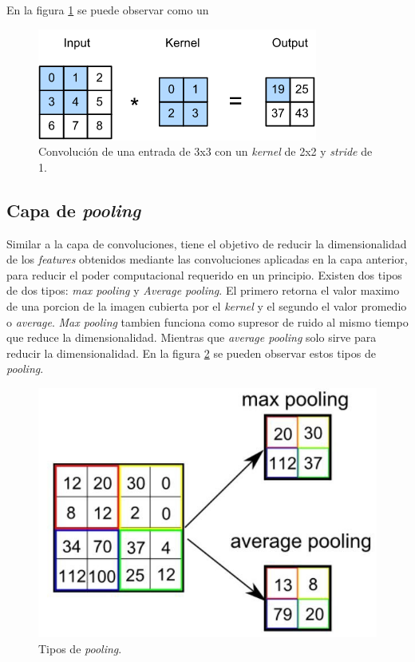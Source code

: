 En la figura \ref{fig:cnn_conv} se puede observar como un 

\begin{figure}[h]
	\centering
	\includegraphics[scale=0.7]{./Figures/cnn_conv.png}
	\caption{Convolución de una entrada de 3x3 con un \textit{kernel} de 2x2 y \textit{stride} de 1.}
	\label{fig:cnn_conv}
\end{figure}

\subsection{Capa de \textit{pooling}}
Similar a la capa de convoluciones, tiene el objetivo de reducir la dimensionalidad de los \textit{features} obtenidos mediante las convoluciones aplicadas en la capa anterior, para reducir el poder computacional requerido en un principio. Existen dos tipos de dos tipos: \textit{max pooling} y \textit{Average pooling}. El primero retorna el valor maximo de una porcion de la imagen cubierta por el \textit{kernel} y el segundo el valor promedio o \textit{average}. \textit{Max pooling} tambien funciona como supresor de ruido al mismo tiempo que reduce la dimensionalidad. Mientras que \textit{average pooling} solo sirve para reducir la dimensionalidad. En la figura \ref{fig:cnn_pool} se pueden observar estos tipos de \textit{pooling}.

\begin{figure}[h]
	\centering
	\includegraphics[scale=0.3]{./Figures/cnn_pool.png}
	\caption{Tipos de \textit{pooling}.}
	\label{fig:cnn_pool}
\end{figure}

